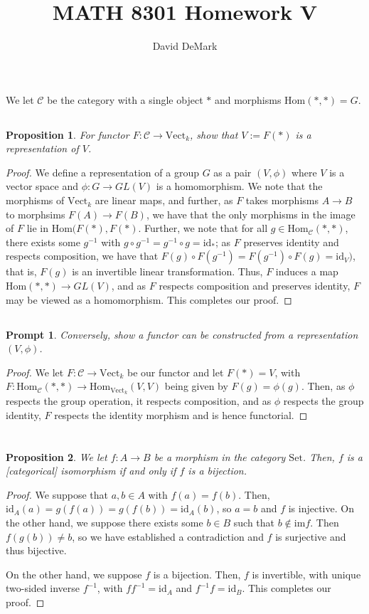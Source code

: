 \documentclass[english]{article}
\title{MATH 8301 Homework V}
\author{David DeMark}
\date{\due}
\newcommand{\prob}[1]{\setcounter{section}{#1-1}\section{}}
\newcommand{\prt}[1]{\setcounter{subsection}{#1-1}\subsection{}}
\newtheorem*{proposition*}{Proposition}
\newtheorem*{prompt*}{Prompt}
\theoremstyle{remark}
\theoremstyle{definition}
\newcommand{\Ccal}{\mathcal{C}}
\newcommand{\id}{\mathrm{id}}
\renewcommand{\hom}{\mathrm{Hom}}
\newcommand{\vect}{\mathrm{Vect}}
\newcommand{\set}{\mathrm{Set}}
\begin{document}
	\maketitle
\prob{1} We let $\Ccal$ be the category with a single object $*$ and morphisms $\hom(*,*)=G$.\prt{1} \begin{proposition*}
For functor $F:\Ccal\to \mathrm{Vect}_k$, show that $V:=F(*)$ is a representation of $V$. 
\end{proposition*}
\begin{proof}
We define a representation of a group $G$ as a pair $(V,\phi)$ where $V$ is a vector space and $\phi:G\to GL(V)$ is a homomorphism. We note that the morphisms of $\vect_k$ are linear maps, and further, as $F$ takes morphisms $A\to B$ to morphsims $F(A)\to F(B)$, we have that the only morphisms in the image of $F$ lie in $\hom(F(*),F(*)$. Further, we note that for all $g\in \hom_\Ccal(*,*)$, there exists some $g^{-1}$ with $g\circ g^{-1}=g^{-1}\circ g=\id_{*}$; as $F$ preserves identity and respects composition, we have that $F(g)\circ F(g^{-1})=F(g^{-1})\circ F(g)=\id_{V})$, that is, $F(g)$ is an invertible linear transformation. Thus, $F$ induces a map $\hom(*,*)\to GL(V)$, and as $F$ respects composition and preserves identity, $F$ may be viewed as a homomorphism. This completes our proof.
\end{proof}
\prt{2}
\begin{prompt*}
	Conversely, show a functor can be constructed from a representation $(V,\phi)$.
\end{prompt*}
\begin{proof}
	We let $F:\Ccal\to \vect_k$ be our functor and let $F(*)=V$, with $F:\hom_\Ccal(*,*)\to \hom_{\vect_k}(V,V)$ being given by $F(g)=\phi(g)$. Then, as $\phi$ respects the group operation, it respects composition, and as $\phi$ respects the group identity, $F$ respects the identity morphism and is hence functorial.
\end{proof}
\prob{2}
\prt{1}\begin{proposition*}
	We let $f:A\to B$ be a morphism in the category $\set$. Then, $f$ is a [categorical] isomorphism if and only if $f$ is a bijection.
\end{proposition*}
\begin{proof}
	We suppose that $a,b\in A$ with $f(a)=f(b)$. Then, $\id_A(a)=g(f(a))=g(f(b))=\id_A(b)$, so $a=b$ and $f$ is injective. On the other hand, we suppose there exists some $b\in B$ such that $b\not \in \mathrm{im}f$. Then $f(g(b))\neq b$, so we have established a contradiction and $f$ is surjective and thus bijective.
	
	On the other hand, we suppose $f$ is a bijection. Then, $f$ is invertible, with unique two-sided inverse $f^{-1}$, with $ff^{-1}=\id_A$ and $f^{-1}f=\id_B$. This completes our proof.
\end{proof}
\end{document}
